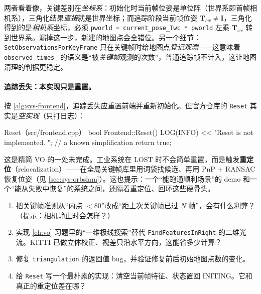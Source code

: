 \begin{pitfall}
两者看着像，关键差别在\emph{坐标系}：初始化时当前帧位姿是单位阵（世界系即首帧相机系），三角化结果\emph{直接}就是世界坐标；而追踪阶段当前帧位姿 $\mathbf{T}_{cw}\ne\mathbf{I}$，三角化得到的是\emph{相机系}坐标，必须 \verb|pworld = current_pose_Twc * pworld| 左乘 $\mathbf{T}_{wc}$ 转到世界系。漏掉这一步，新建的地图点会全错位。另一个细节：\texttt{SetObservationsForKeyFrame} 只在关键帧时给地图点\emph{登记观测}——这意味着 \texttt{observed\_times\_} 的语义是“被\emph{关键帧}观测的次数”，普通追踪帧不计入，这让地图清理的判据更稳定。
\end{pitfall}

\paragraph{追踪丢失：本实现只是重置。}
按 \cref{alg:sys-frontend}，追踪丢失应重置前端并重新初始化。但官方仓库的 \texttt{Reset} 其实是\emph{空实现}（只打日志）：

\begin{codebox}[C++]{Reset（src/frontend.cpp）}
bool Frontend::Reset() {
    LOG(INFO) << "Reset is not implemented. ";     // a known simplification
    return true;
}
\end{codebox}

\noindent 这是精简 VO 的一处未完成。工业系统在 LOST 时不会简单重置，而是触发\textbf{重定位}（relocalization）——在全局关键帧库里用词袋找候选、再用 PnP + RANSAC 恢复位姿（见 \cref{sec:sys-orbslam}）。这也提示：一个“能跑通顺利场景”的 demo 和一个“能从失败中恢复”的系统之间，还隔着重定位、回环这些硬骨头。

\begin{practice}[练习]
\begin{enumerate}
  \item 把关键帧准则从“内点 $<80$”改成“距上次关键帧已过 $N$ 帧”，会有什么利弊？（提示：相机静止时会怎样？）
  \item 实现 \cref{ch:vo} 习题里的“一维极线搜索”替代 \texttt{FindFeaturesInRight} 的二维光流。KITTI 已做立体校正、视差只沿水平方向，这能省多少计算？
  \item 修复 \texttt{triangulation} 的返回值 bug，并验证修复前后初始地图点数的变化。
  \item 给 \texttt{Reset} 写一个最朴素的实现：清空当前帧特征、状态置回 INITING。它和真正的重定位差在哪？
\end{enumerate}
\end{practice}

